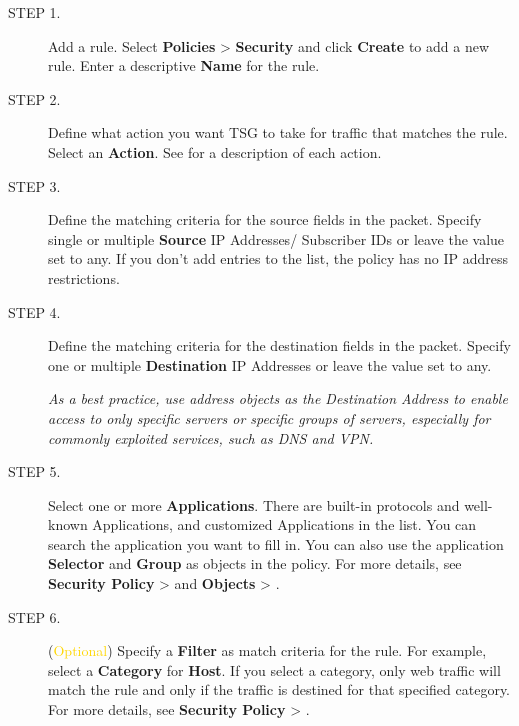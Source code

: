 \begin{description}
    \item[STEP 1.]	Add a rule. Select \textbf{Policies} > \textbf{Security} and click \textbf{Create} to add a new rule. Enter a descriptive \textbf{Name} for the rule.
    \item[STEP 2.]	Define what action you want TSG to take for traffic that matches the rule. Select an \textbf{Action}. 
    See \hyperlink{link:Security Actions}{\color{linkblue}{Security Policy Actions}} for a description of each action.
    \item[STEP 3.]	Define the matching criteria for the source fields in the packet. Specify single or multiple \textbf{Source} IP Addresses/ Subscriber IDs or leave the value set to any. If you don’t add entries to the list, the policy has no IP address restrictions.
    \item[STEP 4.]	Define the matching criteria for the destination fields in the packet. Specify one or multiple \textbf{Destination} IP Addresses or leave the value set to any.
    
    
    \notemark\textit{As a best practice, use address objects as the Destination Address to enable access to only specific servers or specific groups of servers, especially 
    for commonly exploited services, such as DNS and VPN.}
    \item[STEP 5.]	Select one or more \textbf{Applications}. There are built-in protocols and well-known Applications, and customized Applications in the list. 
    You can search the application you want to fill in. You can also use the application \textbf{Selector} and \textbf{Group} as objects in the policy. 
    For more details, see \textbf{Security Policy} > \textbf{\hyperlink{link:Security Applications and Filters}{\color{linkblue}{Applications and Filters}}} and \textbf{Objects} > \textbf{\hyperlink{link:Applications}{\color{linkblue}{Applications}}}.
    \item[STEP 6.]	(\textcolor{gold}{Optional}) Specify a \textbf{Filter} as match criteria for the rule. For example, select a \textbf{Category} for \textbf{Host}. 
    If you select a category, only web traffic will match the rule and only if the traffic is destined for that specified category. 
    For more details, see \textbf{Security Policy} > \textbf{\hyperlink{link:Security Applications and Filters}{\color{linkblue}{Applications and Filters}}}.
    

\end{description}
